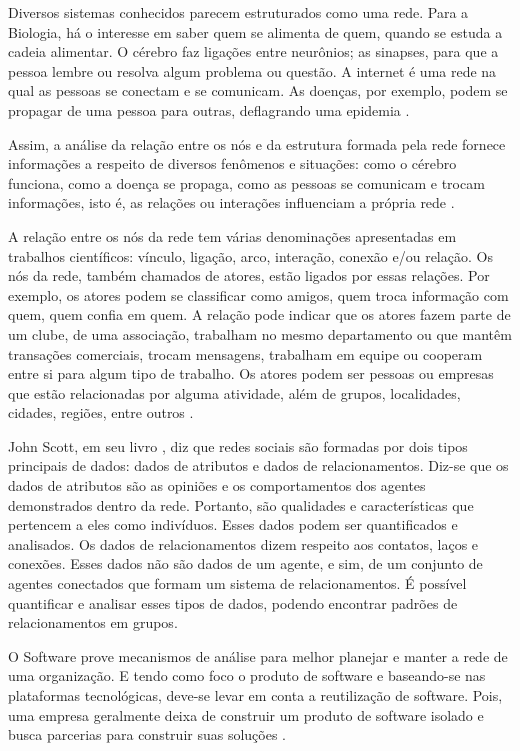 Diversos sistemas conhecidos parecem estruturados como uma rede. Para a Biologia, há o interesse em saber quem se alimenta de quem, quando se estuda a cadeia alimentar. O cérebro faz ligações entre neurônios; as sinapses, para que a pessoa lembre ou resolva algum problema ou questão. A internet é uma rede na qual as pessoas se conectam e se comunicam. As doenças, por exemplo, podem se propagar de uma pessoa para outras, deflagrando uma epidemia \cite{Goular:2014}.

Assim, a análise da relação entre os nós e da estrutura formada pela rede fornece informações a respeito de diversos fenômenos e situações: como o cérebro funciona, como a doença se propaga, como as pessoas se comunicam e trocam informações, isto é, as relações ou interações influenciam a própria rede \cite{Goular:2014}.

A relação entre os nós da rede tem várias denominações apresentadas em trabalhos científicos: vínculo, ligação, arco, interação, conexão e/ou relação. Os nós da rede, também chamados de atores, estão ligados por essas relações. Por exemplo, os atores podem se classificar como amigos, quem troca informação com quem, quem confia em quem. A relação pode indicar que os atores fazem parte de um clube, de uma associação, trabalham no mesmo departamento ou que mantêm transações comerciais, trocam mensagens, trabalham em equipe ou cooperam entre si para algum tipo de trabalho. Os atores podem ser pessoas ou empresas que estão relacionadas por alguma atividade, além de grupos, localidades, cidades, regiões, entre outros \cite{Hanneman:Riddle:2005}.

John Scott, em seu livro \cite{Scott:Carrington:2011}, diz que redes sociais são formadas por dois tipos principais de dados: dados de atributos e dados de relacionamentos. Diz-se que os dados de atributos são as opiniões e os comportamentos dos agentes demonstrados dentro da rede. Portanto, são qualidades e características que pertencem a eles como indivíduos. Esses dados podem ser quantificados e analisados. Os dados de relacionamentos dizem respeito aos contatos, laços e conexões. Esses dados não são dados de um agente, e sim, de um conjunto de agentes conectados que formam um sistema de relacionamentos. É possível quantificar e analisar esses tipos de dados, podendo encontrar padrões de relacionamentos em grupos.

O Software prove mecanismos de análise para melhor planejar e manter a rede de uma organização. E tendo como foco o produto de software e baseando-se nas plataformas tecnológicas, deve-se levar em conta a reutilização de software. Pois, uma empresa geralmente deixa de construir um produto de software isolado e busca parcerias para construir suas soluções \cite{Lima:2015}.

